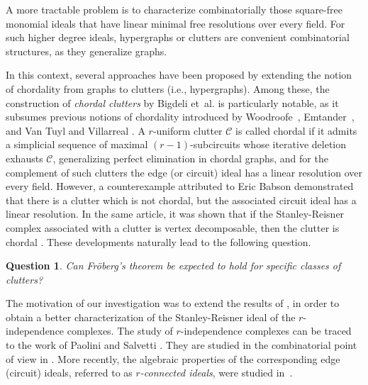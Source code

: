 \documentclass[12pt,reqno]{amsart}
\newtheorem{question}[proposition]{Question}
\theoremstyle{definition}
\begin{document}
A more tractable problem is to characterize combinatorially those square-free monomial ideals that have linear minimal free resolutions over every field. 
For such higher degree ideals, hypergraphs or clutters are convenient combinatorial structures, as they generalize graphs. 

In this context, several approaches have been proposed by extending the notion of chordality from graphs to clutters (i.e., hypergraphs). 
Among these, the construction of \emph{chordal clutters} by Bigdeli et~al. \cite{SBCC} is particularly notable, as it subsumes previous notions of chordality introduced by Woodroofe~\cite{CSCM}, Emtander~\cite{Emtander2008}, and Van Tuyl and Villarreal \cite{tuyl_vill08}. 
A $r$-uniform clutter $\mathcal{C}$ is called chordal if it admits a simplicial sequence of maximal $(r-1)$-subcircuits whose iterative deletion exhausts $\mathcal{C}$, generalizing perfect elimination in chordal graphs, and for the complement of such clutters the edge (or circuit) ideal has a linear resolution over every field.
However, a counterexample attributed to Eric Babson \cite[Example 2.4]{CCVD} demonstrated that there is a clutter which is not chordal, but the associated circuit ideal has a linear resolution. 
In the same article, it was shown that if the Stanley-Reisner complex associated with a clutter is vertex decomposable, then the clutter is chordal \cite[Theorem 3.10]{CCVD}. 
These developments naturally lead to the following question.
	\begin{question}
		Can Fr\"oberg’s theorem be expected to hold for specific classes of clutters?
	\end{question}
	
The motivation of our investigation was to extend the results of \cite{FVDH}, in order to obtain a better characterization of the Stanley-Reisner ideal of the $r$-independence complexes. The study of $r$-independence complexes can be traced to the work of Paolini and Salvetti \cite{WSHAG}. 
They are studied in the combinatorial point of view in \cite{CHVD,FVDH,DDIG,HICH,RoyPatra2025}. More recently, the algebraic properties of the corresponding edge (circuit) ideals, referred to as \emph{$r$-connected ideals}, were studied in~\cite{LQCG,2025connectedideals}.
\end{document}
